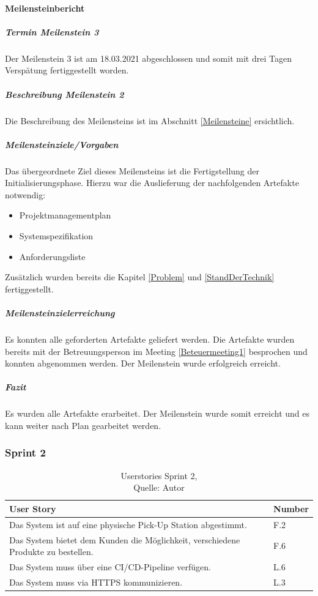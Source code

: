 \paragraph{Meilensteinbericht}
\subparagraph{Termin Meilenstein 3}
Der Meilenstein 3 ist am 18.03.2021 abgeschlossen und somit mit drei Tagen Verspätung fertiggestellt worden. 
\subparagraph{Beschreibung Meilenstein 2}
Die Beschreibung des Meilensteins ist im Abschnitt \ref{Meilensteine} ersichtlich. 
\subparagraph{Meilensteinziele/Vorgaben}
Das übergeordnete Ziel dieses Meilensteins ist die Fertigstellung der Initialisierungsphase.
Hierzu war die Auslieferung der nachfolgenden Artefakte notwendig:
\begin{itemize}
	\item Projektmanagementplan
	\item Systemspezifikation
	\item Anforderungsliste
\end{itemize}
Zusätzlich wurden bereits die Kapitel \ref{Problem} und \ref{StandDerTechnik} fertiggestellt. 
\subparagraph{Meilensteinzielerreichung}
Es konnten alle geforderten Artefakte geliefert werden. Die Artefakte wurden bereits mit der Betreuungsperson im Meeting \ref{Beteuermeeting1} besprochen und konnten abgenommen werden. 
Der Meilenstein wurde erfolgreich erreicht. 
\subparagraph{Fazit}
Es wurden alle Artefakte erarbeitet. Der Meilenstein wurde somit erreicht und es kann weiter nach Plan gearbeitet werden.

\subsubsection{Sprint 2}\label{sprint2}
\begin{table}[H]
	\setlength\extrarowheight{2pt} %
	\begin{tabularx}{\textwidth}{|X|l|}
		\hline
		\textbf{User Story} & \textbf{Number} \\
		\hline
		Das System ist auf eine physische Pick-Up Station abgestimmt. & F.2\\
		\hline
		Das System bietet dem Kunden die Möglichkeit, verschiedene Produkte zu bestellen. & F.6\\
		\hline
		Das System muss über eine CI/CD-Pipeline verfügen. & L.6 \\
		\hline
		Das System muss via HTTPS kommunizieren. & L.3 \\
		\hline
	\end{tabularx} 
	\caption[Userstories Sprint 2]{Userstories Sprint 2,\\ Quelle: Autor}
\end{table}\label{userStoriesSprint2}

